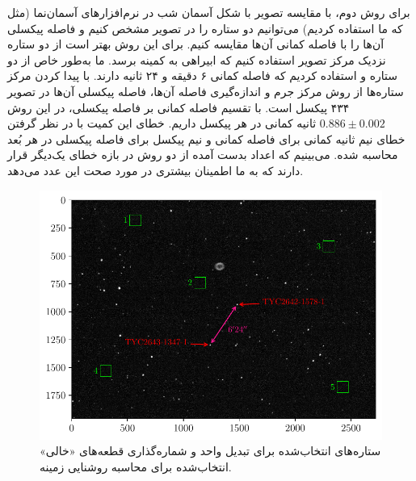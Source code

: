 \documentclass[12pt,a4paper]{article}
\begin{document}
	برای روش دوم، با مقایسه تصویر با شکل آسمان شب در نرم‌افزارهای آسمان‌نما (مثل  که ما استفاده کردیم)
	می‌توانیم دو ستاره را در تصویر مشخص کنیم و فاصله پیکسلی آن‌ها را با فاصله کمانی آن‌ها مقایسه کنیم. برای این روش
	بهتر است از دو ستاره نزدیک مرکز تصویر استفاده کنیم که ابیراهی به کمینه برسد. ما به‌طور خاص از دو
	ستاره  و  استفاده کردیم که فاصله کمانی ۶ دقیقه و ۲۴ ثانیه دارند.
	با پیدا کردن مرکز ستاره‌ها از روش مرکز جرم و اندازه‌گیری فاصله آن‌ها، فاصله پیکسلی آن‌ها در تصویر ۴۳۴ پیکسل است.
	با تقسیم فاصله کمانی بر فاصله پیکسلی، در این روش $0.886\pm0.002 $ ثانیه کمانی در هر پیکسل داریم. خطای این کمیت
	با در نظر گرفتن خطای نیم ثانیه کمانی برای فاصله کمانی و نیم پیکسل برای فاصله پیکسلی در هر بُعد محاسبه شده.
	می‌بینیم که اعداد بدست آمده از دو روش در بازه خطای یک‌دیگر قرار دارند که به ما اطمینان بیشتری در مورد صحت
	این عدد می‌دهد.
	\begin{figure}[h!]
		\centering
		\includegraphics[width=\linewidth]{../markings}
		\caption{ستاره‌های انتخاب‌شده برای تبدیل واحد
			و شماره‌گذاری قطعه‌های «خالی» انتخاب‌شده برای محاسبه روشنایی زمینه.}
		\label{fig:markings}
	\end{figure}
\end{document}

